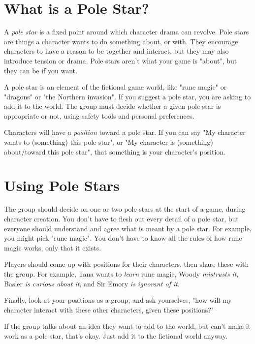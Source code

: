 \documentclass[10pt,oneside,letterpaper,landscape]{memoir}
\begin{document}
\begin{multicols}{3}
\vspace{2mm}

\section{What is a Pole Star?}

A \textit{pole star} is a fixed point around which character drama can revolve. Pole stars are things a character wants to do something about, or with. They encourage characters to have a reason to be together and interact, but they may also introduce tension or drama. Pole stars aren't what your game is "about", but they can be if you want.

A pole star is an element of the fictional game world, like "rune magic" or "dragons" or "the Northern invasion". If you suggest a pole star, you are asking to add it to the world. The group must decide whether a given pole star is appropriate or not, using safety tools and personal preferences.

Characters will have a \textit{position} toward a pole star. If you can say "My character wants to (something) this pole star", or "My character is (something) about/toward this pole star", that something is your character's position.

\section{Using Pole Stars}

The group should decide on one or two pole stars at the start of a game, during character creation. You don't have to flesh out every detail of a pole star, but everyone should understand and agree what is meant by a pole star. For example, you might pick "rune magic". You don't have to know all the rules of how rune magic works, only that it exists.

Players should come up with positions for their characters, then share these with the group. For example, Tana wants to \textit{learn} rune magic, Woody \textit{mistrusts it}, Basler \textit{is curious about it}, and Sir Emory \textit{is ignorant of it}.

Finally, look at your positions as a group, and ask yourselves, "how will my character interact with these other characters, given these positions?"

If the group talks about an idea they want to add to the world, but can't make it work as a pole star, that's okay. Just add it to the fictional world anyway.


\end{multicols}
\end{document}
